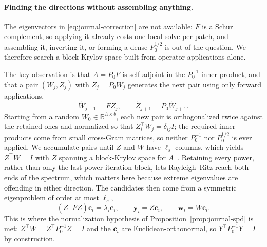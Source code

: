 \documentclass{article}
\newcommand{\vect}[1]{\boldsymbol{#1}}
\newcommand{\R}{\mathbb{R}}
\newcommand{\Fschur}{F}                           %
\theoremstyle{plain}
\numberwithin{equation}{section}
\begin{document}
\paragraph{Finding the directions without assembling anything.}
The eigenvectors in \eqref{eq:journal-correction} are not available: $\Fschur$
is a Schur complement, so applying it already costs one local solve per patch,
and assembling it, inverting it, or forming a dense $P_0^{1/2}$ is out of the
question.  We therefore search a block-Krylov space built from operator
applications alone.

The key observation is that $A=P_0\Fschur$ is self-adjoint in the $P_0^{-1}$
inner product, and that a pair $(W_j,Z_j)$ with $Z_j=P_0W_j$ generates the next
pair using only forward applications,
\begin{equation}
    \widetilde W_{j+1}=\Fschur Z_j,\qquad
    \widetilde Z_{j+1}=P_0\widetilde W_{j+1}.
    \label{eq:journal-block-krylov}
\end{equation}
Starting from a random $W_0\in\R^{\Lambda\times b}$, each new pair is
orthogonalized twice against the retained ones and normalized so that
$Z_i^\top W_j=\delta_{ij}I$; the required inner products come from small cross-Gram
matrices, so neither $P_0^{-1}$ nor $P_0^{1/2}$ is ever applied.  We accumulate
pairs until $Z$ and $W$ have $\ell_s$ columns, which yields $Z^\top W=I$ with
$Z$ spanning a block-Krylov space for $A$~\cite{saad2003iterative}.  Retaining
every power, rather than only the last power-iteration block, lets
Rayleigh--Ritz reach both ends of the spectrum, which matters here because
extreme eigenvalues are offending in either direction.  The candidates then
come from a symmetric eigenproblem of order at most $\ell_s$,
\begin{equation}
    (Z^\top\Fschur Z)\vect c_i=\lambda_i\vect c_i,
    \qquad \vect y_i=Z\vect c_i,
    \qquad \vect w_i=W\vect c_i .
    \label{eq:journal-ritz}
\end{equation}
This is where the normalization hypothesis of
Proposition~\ref{prop:journal-spd} is met: $Z^\top W=Z^\top P_0^{-1}Z=I$ and
the $\vect c_i$ are Euclidean-orthonormal, so $Y^\top P_0^{-1}Y=I$ by
construction.
\end{document}
